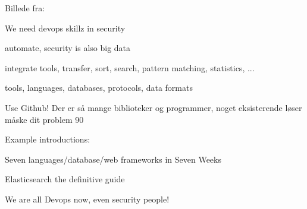 \documentclass[Screen16to9,17pt]{foils}
\begin{document}
Billede fra: 



\begin{list1}
\item We need devops skillz in security
\item automate, security is also big data
\item integrate tools, transfer, sort, search, pattern matching, statistics, ...
\item tools, languages, databases, protocols, data formats
\item Use Github! Der er så mange biblioteker og programmer, noget eksisterende løser måske dit problem 90%
\item Example introductions:
\begin{list2}
\item Seven languages/database/web frameworks in Seven Weeks
\item Elasticsearch the definitive guide
\end{list2}
\end{list1}

\centerline{We are all Devops now, even security people!}


\myquestionspage
\end{document}
